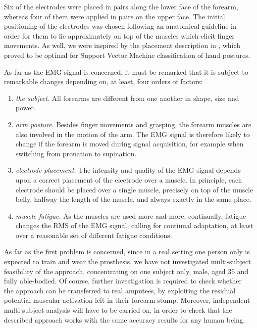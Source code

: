 Six of the electrodes were placed in pairs along the lower face
of the forearm, whereas four of them were applied in pairs on the
upper face. The initial positioning of the electrodes was chosen
following an anatomical guideline \cite{...} in order for them to lie
approximately on top of the muscles which elicit finger movements. As
well, we were inspired by the placement description in \cite{smagt},
which proved to be optimal for Support Vector Machine classification
of hand postures.

As far as the EMG signal is concerned, it must be remarked that it is
subject to remarkable changes depending on, at least, four orders of
factors:

\begin{enumerate}

  \item \emph{the subject.} All forearms are different from one
    another in shape, size and power.

  \item \emph{arm posture.} Besides finger movements and grasping, the
    forearm muscles are also involved in the motion of the arm. The
    EMG signal is therefore likely to change if the forearm is moved
    during signal acquisition, for example when switching from
    pronation to supination.

  \item \emph{electrode placement.} The intensity and quality of the
    EMG signal depends upon a correct placement of the electrode over
    a muscle. In principle, each electrode should be placed over a
    single muscle, precisely on top of the muscle belly, halfway the
    length of the muscle, and always exactly in the same place.

  \item \emph{muscle fatigue.} As the muscles are used more and more,
    continually, fatigue changes the RMS of the EMG signal, calling
    for continual adaptation, at least over a reasonable set of
    different fatigue conditions.

\end{enumerate}

As far as the first problem is concerned, since in a real setting one
person only is expected to train and wear the prosthesis, we have not
investigated multi-subject feasibility of the approach, concentrating
on one subject only, male, aged $35$ and fully able-bodied. Of course,
further investigation is required to check whether the approach can be
transferred to real amputees, by exploiting the residual potential
muscular activation left in their forearm stump. Moreover, independent
multi-subject analysis will have to be carried on, in order to check
that the described approach works with the same accuracy results for
any human being.

